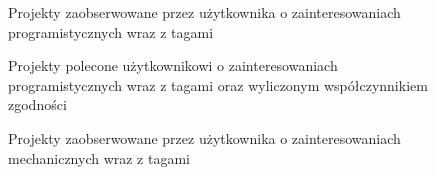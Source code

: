 \begin{figure}[h!]
	\caption{Projekty zaobserwowane przez użytkownika o zainteresowaniach programistycznych wraz z tagami}
	\centering
\end{figure}

\begin{figure}[h!]
	\caption{Projekty polecone użytkownikowi o zainteresowaniach programistycznych wraz z tagami oraz wyliczonym współczynnikiem zgodności}
	\centering
\end{figure}





\begin{figure}[h!]
	\caption{Projekty zaobserwowane przez użytkownika o zainteresowaniach mechanicznych wraz z tagami}
	\centering
\end{figure}

